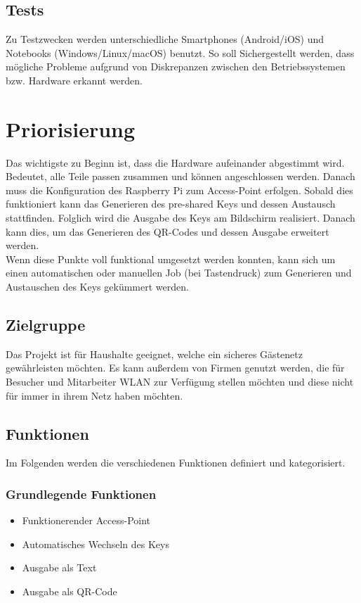 \documentclass[a4paper,11pt,singlespacing]{article}
\begin{document}
		\subsection{Tests}
		Zu Testzwecken werden unterschiedliche Smartphones (Android/iOS) und Notebooks (Windows/Linux/macOS) benutzt. So soll Sichergestellt werden, dass mögliche Probleme aufgrund von Diskrepanzen zwischen den Betriebssystemen bzw. Hardware erkannt werden.
	
	\section{Priorisierung}
	
	Das wichtigste zu Beginn ist, dass die Hardware aufeinander abgestimmt wird. Bedeutet, alle Teile passen zusammen und können angeschlossen werden.
	Danach muss die Konfiguration des Raspberry Pi zum Access-Point erfolgen. Sobald dies funktioniert kann das Generieren des pre-shared Keys und dessen Austausch stattfinden. Folglich wird die Ausgabe des Keys am Bildschirm realisiert. Danach kann dies, um das Generieren des QR-Codes und dessen Ausgabe erweitert werden.\\
	Wenn diese Punkte voll funktional umgesetzt werden konnten, kann sich um einen automatischen oder manuellen Job (bei Tastendruck) zum Generieren und Austauschen des Keys gekümmert werden.
		
		\subsection{Zielgruppe}
		Das Projekt ist für Haushalte geeignet, welche ein sicheres Gästenetz gewährleisten möchten. Es kann außerdem von Firmen genutzt werden, die für Besucher und Mitarbeiter WLAN zur Verfügung stellen möchten und diese nicht für immer in ihrem Netz haben möchten. 
		
		\subsection{Funktionen}
		Im Folgenden werden die verschiedenen Funktionen definiert und kategorisiert.
			\subsubsection{Grundlegende Funktionen}
			\begin{itemize}
				\item Funktionerender Access-Point
				\item Automatisches Wechseln des Keys
				\item Ausgabe als Text
				\item Ausgabe als QR-Code
			\end{itemize}
		
\end{document}

